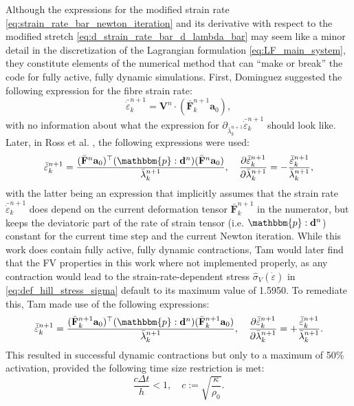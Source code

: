 \documentclass{sfuthesis}
\numberwithin{equation}{section}
\numberwithin{figure}{chapter}
\numberwithin{table}{chapter}
\theoremstyle{definition}
\def\*#1{{\mathbf{#1}}} %
\newcommand{\pder}[2]{\dfrac{\partial #1}{\partial #2}}
\newcommand{\depsilon}{\dot{\varepsilon}}
\newcommand{\T}{\top}
\newcommand{\p}{\mathbbm{p}}
\begin{document}
{\color{blue}
Although the expressions for the modified strain rate \eqref{eq:strain_rate_bar_newton_iteration} and its derivative with respect to the modified stretch \eqref{eq:d_strain_rate_bar_d_lambda_bar} may seem like a minor detail in the discretization of the Lagrangian formulation \eqref{eq:LF_main_system}, they constitute elements of the numerical method that can ``make or break'' the code for fully active, fully dynamic simulations. First, Dominguez \cite{Seba} suggested the following expression for the fibre strain rate:
\begin{equation}
    \bar{\depsilon}_k^{n+1} = \*V^n \cdot (\bar{\*F}_k^{n+1} \*a_0),
\end{equation}
with no information about what the expression for $\partial_{\bar{\lambda}_k^{n+1}} \bar{\depsilon}_k^{n+1}$ should look like. Later, in Ross et al. \cite{Paper3_RossEtAl2021}, the following expressions were used:
\begin{equation}
    \bar{\depsilon}_k^{n+1} = \dfrac{(\bar{\*F}^{n}\*a_0)^\T (\p : \*d^{n}) (\bar{\*F}^{n} \*a_0)}{\bar{\lambda}^{n+1}_k}, \quad \pder{\bar{\depsilon}_k^{n+1}}{\bar{\lambda}_k^{n+1}} = -\dfrac{\bar{\depsilon}_k^{n+1}}{\bar{\lambda}_k^{n+1}},
\end{equation}
with the latter being an expression that implicitly assumes that the strain rate $\bar{\depsilon}_k^{n+1}$ does depend on the current deformation tensor $\bar{\*F}_k^{n+1}$ in the numerator, but keeps the deviatoric part of the rate of strain tensor (i.e. $\p:\*d^n$) constant for the current time step and the current Newton iteration. While this work does contain fully active, fully dynamic contractions, Tam \cite{Cassidy} would later find that the FV properties in this work where not implemented properly, as any contraction would lead to the strain-rate-dependent stress $\widehat{\sigma}_V(\depsilon)$ in \eqref{eq:def_hill_stress_sigma} default to its maximum value of 1.5950. To remediate this, Tam \cite{Cassidy} made use of the following expressions:
\begin{equation}
    \bar{\depsilon}_k^{n+1} = \dfrac{(\bar{\*F}_k^{n+1}\*a_0)^\T (\p : \*d^{n}) (\bar{\*F}_k^{n+1} \*a_0)}{\bar{\lambda}^{n+1}_k}, \quad \pder{\bar{\depsilon}_k^{n+1}}{\bar{\lambda}_k^{n+1}} = +\dfrac{\bar{\depsilon}_k^{n+1}}{\bar{\lambda}_k^{n+1}}.
\end{equation}
This resulted in successful dynamic contractions but only to a maximum of 50\% activation, provided the following time size restriction is met:
\begin{equation}
    \dfrac{c \Delta t}{h} < 1, \quad c := \sqrt{\dfrac{\kappa}{\rho_0}}.
\end{equation}
}
\end{document}
